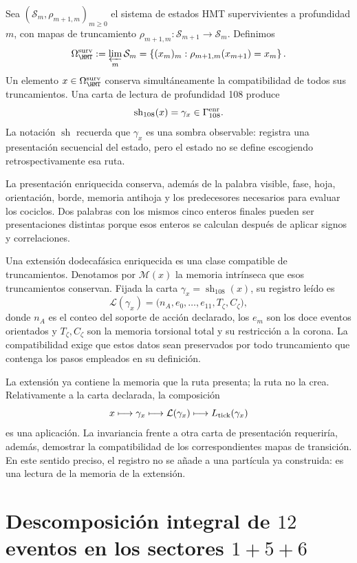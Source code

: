 Sea \((\mathcal S_m,\rho_{m+1,m})_{m\geq0}\) el sistema de estados HMT
supervivientes a profundidad \(m\), con mapas de truncamiento
\(\rho_{m+1,m}:\mathcal S_{m+1}\to\mathcal S_m\). Definimos
\[
 \Omega_{\HMT}^{\rm surv}
 :=\varprojlim_m\mathcal S_m
 =\left\{(x_m)_m:\rho_{m+1,m}(x_{m+1})=x_m\right\}.
\]
Un elemento \(x\in\Omega_{\HMT}^{\rm surv}\) conserva simultáneamente la
compatibilidad de todos sus truncamientos. Una carta de lectura de profundidad
108 produce
\[
 \operatorname{sh}_{108}(x)=\gamma_x\in\Gamma_{108}^{\rm enr}.
\]
La notación \(\operatorname{sh}\) recuerda que \(\gamma_x\) es una sombra
observable: registra una presentación secuencial del estado, pero el estado no
se define escogiendo retrospectivamente esa ruta.

La presentación enriquecida conserva, además de la palabra visible, fase,
hoja, orientación, borde, memoria antihoja y los predecesores necesarios para
evaluar los cociclos. Dos palabras con los mismos cinco enteros finales pueden
ser presentaciones distintas porque esos enteros se calculan después de
aplicar signos y correlaciones.

\begin{definition}
Una extensión dodecafásica enriquecida es una clase compatible de
truncamientos. Denotamos por \(\mathscr M(x)\) la memoria intrínseca que esos
truncamientos conservan. Fijada la carta
\(\gamma_x=\operatorname{sh}_{108}(x)\), su registro leído es
\[
 \mathcal L(\gamma_x)
 =\bigl(n_A,e_0,\ldots,e_{11},T_\zeta,C_\zeta\bigr),
\]
donde \(n_A\) es el conteo del soporte de acción declarado, los \(e_m\) son
los doce eventos orientados y \(T_\zeta,C_\zeta\) son la memoria torsional
total y su restricción a la corona. La compatibilidad exige que estos datos
sean preservados por todo truncamiento que contenga los pasos empleados en su
definición.
\end{definition}

La extensión ya contiene la memoria que la ruta presenta; la ruta no la crea.
Relativamente a la carta declarada, la composición
\[
x\longmapsto\gamma_x
\longmapsto\mathcal L(\gamma_x)
\longmapsto L_{\rm tick}(\gamma_x)
\]
es una aplicación. La invariancia frente a otra carta de presentación
requeriría, además, demostrar la compatibilidad de los correspondientes mapas
de transición. En este sentido preciso, el registro no se añade a una
partícula ya construida: es una lectura de la memoria de la extensión.

\section{Descomposición integral de \(12\) eventos en los sectores \(1+5+6\)}

